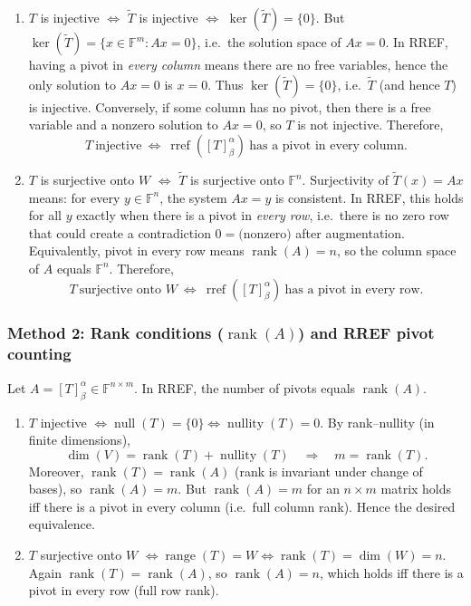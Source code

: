 \documentclass[12pt]{article}
\newcommand{\F}{\mathbb{F}}
\DeclareMathOperator{\Range}{range}
\DeclareMathOperator{\Rank}{rank}
\DeclareMathOperator{\Nullity}{nullity}
\DeclareMathOperator{\Null}{null}
\DeclareMathOperator{\rref}{rref}
\begin{document}
\begin{enumerate}[label=(\arabic*)]
\item $T$ is injective $\Longleftrightarrow$ $\widetilde{T}$ is injective $\Longleftrightarrow$ $\ker(\widetilde{T})=\{0\}$.
But $\ker(\widetilde{T})=\{x\in\F^m:Ax=0\}$, i.e.\ the solution space of $Ax=0$.
In RREF, having a pivot in \emph{every column} means there are no free variables, hence the only solution to $Ax=0$ is $x=0$.
Thus $\ker(\widetilde{T})=\{0\}$, i.e.\ $\widetilde{T}$ (and hence $T$) is injective.
Conversely, if some column has no pivot, then there is a free variable and a nonzero solution to $Ax=0$, so $T$ is not injective.
Therefore,
\[
\boxed{\,T\ \text{injective}\ \Longleftrightarrow\ \rref([T]_\beta^\alpha)\ \text{has a pivot in every column.}\,}
\]

\item $T$ is surjective onto $W$ $\Longleftrightarrow$ $\widetilde{T}$ is surjective onto $\F^n$.
Surjectivity of $\widetilde{T}(x)=Ax$ means: for every $y\in\F^n$, the system $Ax=y$ is consistent.
In RREF, this holds for all $y$ exactly when there is a pivot in \emph{every row}, i.e.\ there is no zero row that could create a contradiction
$0=\text{(nonzero)}$ after augmentation.
Equivalently, pivot in every row means $\Rank(A)=n$, so the column space of $A$ equals $\F^n$.
Therefore,
\[
\boxed{\,T\ \text{surjective onto }W\ \Longleftrightarrow\ \rref([T]_\beta^\alpha)\ \text{has a pivot in every row.}\,}
\]
\end{enumerate}

\subsubsection{Method 2: Rank conditions ($\Rank(A)$) and RREF pivot counting}
Let $A=[T]_\beta^\alpha\in\F^{n\times m}$. In RREF, the number of pivots equals $\Rank(A)$.

\begin{enumerate}[label=(\arabic*)]
\item $T$ injective $\Longleftrightarrow \Null(T)=\{0\}\Longleftrightarrow \Nullity(T)=0$.
By rank--nullity (in finite dimensions),
\[
\dim(V)=\Rank(T)+\Nullity(T)\quad\Longrightarrow\quad m=\Rank(T).
\]
Moreover, $\Rank(T)=\Rank(A)$ (rank is invariant under change of bases), so $\Rank(A)=m$.
But $\Rank(A)=m$ for an $n\times m$ matrix holds iff there is a pivot in every column (i.e.\ full column rank).
Hence the desired equivalence.

\item $T$ surjective onto $W$ $\Longleftrightarrow \Range(T)=W\Longleftrightarrow \Rank(T)=\dim(W)=n$.
Again $\Rank(T)=\Rank(A)$, so $\Rank(A)=n$, which holds iff there is a pivot in every row (full row rank).
\end{enumerate}
\end{document}
